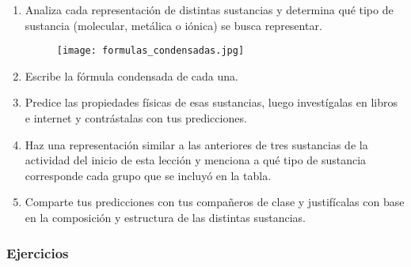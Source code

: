 \begin{boxK}
    \begin{enumerate}
        \item Analiza cada representación de distintas sustancias y determina qué tipo de sustancia (molecular, metálica o iónica) se busca representar.
              \begin{figure}[H]
                  \centering
                  \texttt{[image: formulas\_condensadas.jpg]}
              \end{figure}
        \item Escribe la fórmula condensada de cada una.
        \item Predice las propiedades físicas de esas sustancias, luego investígalas en libros e internet y contrástalas con tus predicciones.
        \item Haz una representación similar a las anteriores de tres sustancias de la actividad del inicio de esta lección y menciona a qué tipo de sustancia corresponde cada grupo que se incluyó en la tabla.
        \item Comparte tus predicciones con tus compañeros de clase y justifícalas con base en la composición y estructura de las distintas sustancias.
    \end{enumerate}
\end{boxK}

\subsubsection{Ejercicios}

